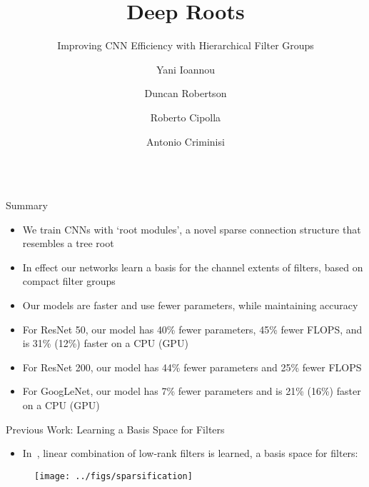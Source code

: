 \documentclass[final]{beamer}
\title %
{Deep Roots}
\subtitle{Improving CNN Efficiency with Hierarchical Filter Groups}
\author[Y. Ioannou, D. Robertson, R. Cipolla and A. Criminisi]
{Yani Ioannou\inst{1} \and Duncan Robertson\inst{2} \and Roberto Cipolla\inst{1} \and Antonio Criminisi\inst{2}}
\institute[University of Cambridge and Microsoft Research] %
{\inst{1} University of Cambridge, \inst{2} Microsoft Research, Cambridge}
\date
\begin{document}


\begin{frame}{}

\begin{columns}[t]

\begin{column}{0.32\paperwidth}

\begin{block}{Summary}
  \begin{itemize}
	\item We train CNNs with `root modules', a novel sparse connection structure that resembles a tree root
    \item In effect our networks learn a basis for the channel extents of filters, based on compact filter groups
	\item Our models are \alert{faster} and use \alert{fewer parameters}, while maintaining \alert{accuracy}
      \item For \alert{ResNet 50}, our model has \alert{40\%} fewer parameters, \alert{45\%} fewer FLOPS, and is 31\% (12\%) faster on a CPU (GPU)
      \item For \alert{ResNet 200}, our model has \alert{44\%} fewer parameters and \alert{25\%} fewer FLOPS
      \item For GoogLeNet, our model has 7\% fewer parameters and is 21\% (16\%) faster on a CPU (GPU)
  \end{itemize}
\end{block}

\begin{block}{Previous Work: Learning a Basis Space for Filters}{}
\begin{itemize}
   \item In~\citep{Ioannou2016}, linear combination of low-rank filters is learned, \ie a basis space for filters:
\end{itemize}

\vspace{1em}

\begin{figure}
   \texttt{[image: ../figs/sparsification]}
\end{figure}


\end{block}
\end{column}
\end{columns}
\end{frame}
\end{document}
